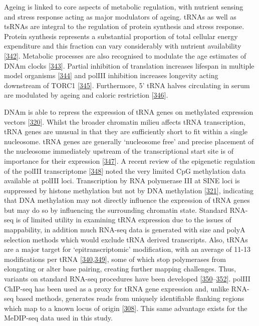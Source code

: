 \documentclass[
]{book}
\begin{document}
Ageing is linked to core aspects of metabolic regulation, with nutrient sensing and stress response acting as major modulators of ageing.
tRNAs as well as tsRNAs are integral to the regulation of protein synthesis and stress response.
Protein synthesis represents a substantial proportion of total cellular energy expenditure and this fraction can vary considerably with nutrient availability {[}\protect\hyperlink{ref-Pace2006}{342}{]}.
Metabolic processes are also recognised to modulate the age estimates of DNAm clocks {[}\protect\hyperlink{ref-Nwanaji-Enwerem2018}{343}{]}.
Partial inhibition of translation increases lifespan in multiple model organisms {[}\protect\hyperlink{ref-Hansen2007}{344}{]} and polIII inhibition increases longevity acting downstream of TORC1 {[}\protect\hyperlink{ref-Filer2017}{345}{]}.
Furthermore, 5' tRNA halves circulating in serum are modulated by ageing and caloric restriction {[}\protect\hyperlink{ref-Dhahbi2013}{346}{]}.

DNAm is able to repress the expression of tRNA genes on methylated expression vectors {[}\protect\hyperlink{ref-Besser1990}{320}{]}.
Whilst the broader chromatin milieu affects tRNA transcription, tRNA genes are unusual in that they are sufficiently short to fit within a single nucleosome.
tRNA genes are generally `nucleosome free' and precise placement of the nucleosome immediately upstream of the transcriptional start site is of importance for their expression {[}\protect\hyperlink{ref-Bhargava2013a}{347}{]}.
A recent review of the epigenetic regulation of the polIII transcriptome {[}\protect\hyperlink{ref-Park2017}{348}{]} noted the very limited CpG methylation data available at polIII loci.
Transcription by RNA polymerase III at SINE loci is suppressed by histone methylation but not by DNA methylation {[}\protect\hyperlink{ref-Varshney2015}{321}{]}, indicating that DNA methylation may not directly influence the expression of tRNA genes but may do so by influencing the surrounding chromatin state.
Standard RNA-seq is of limited utility in examining tRNA expression due to the issues of mappability, in addition much RNA-seq data is generated with size and polyA selection methods which would exclude tRNA derived transcripts.
Also, tRNAs are a major target for `epitranscriptomic' modification, with an average of 11-13 modifications per tRNA {[}\protect\hyperlink{ref-Schimmel2017}{340},\protect\hyperlink{ref-Wilusz2015}{349}{]}, some of which stop polymerases from elongating or alter base pairing, creating further mapping challenges.
Thus, variants on standard RNA-seq procedures have been developed {[}\protect\hyperlink{ref-Cozen2015}{350}--\protect\hyperlink{ref-Gogakos2017}{352}{]}.
polIII ChIP-seq has been used as a proxy for tRNA gene expression and, unlike RNA-seq based methods, generates reads from uniquely identifiable flanking regions which map to a known locus of origin {[}\protect\hyperlink{ref-Canella2010}{308}{]}.
This same advantage exists for the MeDIP-seq data used in this study.
\end{document}
